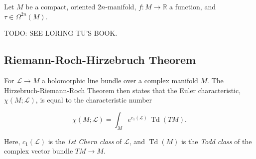 \documentclass{article}
\newcommand{\ra}{\rightarrow}
\newcommand{\W}{\Omega}
\newcommand{\RR}{\mathbb{R}}
\newcommand{\mcL}{\mathcal{L}}
\DeclareMathOperator{\Td}{Td}
\begin{document}
Let $M$ be a compact, oriented $2n$-manifold, $f : M \ra \RR$ a function, and $\tau \in \W^{2n}(M)$.

TODO: SEE LORING TU'S BOOK.

\subsection{Riemann-Roch-Hirzebruch Theorem}

For $\mcL \ra M$ a holomorphic line bundle over a complex manifold $M$. The Hirzebruch-Riemann-Roch Theorem then states that the Euler characteristic, $\chi(M; \mcL)$, is equal to the characteristic number

\begin{equation*}
	\chi(M; \mcL) =	\int_{M} e^{c_{1}(\mcL)}\, \Td(TM).
\end{equation*}

Here, $c_{1}(\mcL)$ is the \emph{1st Chern class} of $\mcL$, and $\Td(M)$ is the \emph{Todd class} of the complex vector bundle $TM \ra M$.







  


\end{document}
